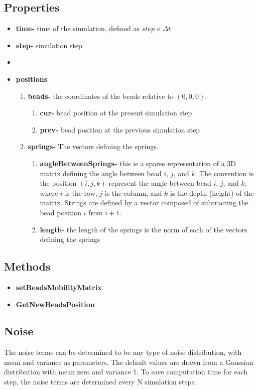 \documentclass[12pt]{report}
\begin{document}
\subsection{Properties}
\begin{itemize}
\item{\textbf{time-}} time of the simulation, defined as $step\times\Delta t$
\item{\textbf{step-}} simulation step
\item{\textbf{}}
\item{\textbf{positions}}
\begin{enumerate}
\item{\textbf{beads-}} the coordinates of the beads relative to $(0,0,0)$.
\begin{enumerate}
\item{\textbf{cur-}} bead position at the present simulation step 
\item{\textbf{prev-}} bead position at the previous simulation step
\end{enumerate}
\item{\textbf{springs-}} The vectors defining the springs.
\begin{enumerate}
\item{\textbf{angleBetweenSprings-}} this is a sparse representation of a 3D matrix defining the angle between bead $i$, $j$, and $k$. The convention is the position $(i,j,k)$ represent the angle between bead $i$, $j$, and $k$, where $i$ is the row, $j$ is the column, and $k$ is the depth (height) of the matrix. Strings are defined by a vector composed of subtracting the bead position $i$ from $i+1$.
\item{\textbf{length}}- the length of the springs is the norm of each of the vectors defining the springs
\end{enumerate}


\end{enumerate}
\end{itemize}

\subsection{Methods}
\begin{itemize}
\item{\textbf{setBeadsMobilityMatrix}}
\item{\textbf{GetNewBeadsPosition}}
\end{itemize}

\subsection{Noise} 
The noise terms can be determined to be any type of noise distribution, with mean and variance as parameters. The default values are drawn from a Gaussian distribution with mean zero and variance 1. 
To save computation time for each step, the noise terms are determined every N simulation steps. 
\end{document}
